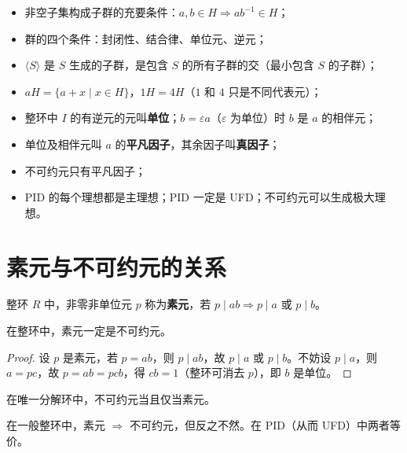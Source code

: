 \begin{note}[关键关系总结]
\begin{itemize}
  \item 非空子集构成子群的充要条件：$a, b \in H \Rightarrow ab^{-1} \in H$；
  \item 群的四个条件：封闭性、结合律、单位元、逆元；
  \item $\langle S \rangle$ 是 $S$ 生成的子群，是包含 $S$ 的所有子群的交（最小包含 $S$ 的子群）；
  \item $aH = \{a + x \mid x \in H\}$，$1H = 4H$（$1$ 和 $4$ 只是不同代表元）；
  \item 整环中 $I$ 的有逆元的元叫\textbf{单位}；$b = \varepsilon a$（$\varepsilon$ 为单位）时 $b$ 是 $a$ 的相伴元；
  \item 单位及相伴元叫 $a$ 的\textbf{平凡因子}，其余因子叫\textbf{真因子}；
  \item 不可约元只有平凡因子；
  \item PID 的每个理想都是主理想；PID 一定是 UFD；不可约元可以生成极大理想。
\end{itemize}
\end{note}

\section{素元与不可约元的关系}

\begin{definition}[素元]
整环 $R$ 中，非零非单位元 $p$ 称为\textbf{素元}，若 $p \mid ab \Rightarrow p \mid a$ 或 $p \mid b$。
\end{definition}

\begin{proposition}[素元一定是不可约元]
在整环中，素元一定是不可约元。
\end{proposition}

\begin{proof}
设 $p$ 是素元，若 $p = ab$，则 $p \mid ab$，故 $p \mid a$ 或 $p \mid b$。不妨设 $p \mid a$，则 $a = pc$，故 $p = ab = pcb$，得 $cb = 1$（整环可消去 $p$），即 $b$ 是单位。
\end{proof}

\begin{proposition}
在唯一分解环中，不可约元当且仅当素元。
\end{proposition}

\begin{note}
在一般整环中，素元 $\Rightarrow$ 不可约元，但反之不然。在 PID（从而 UFD）中两者等价。
\end{note}

